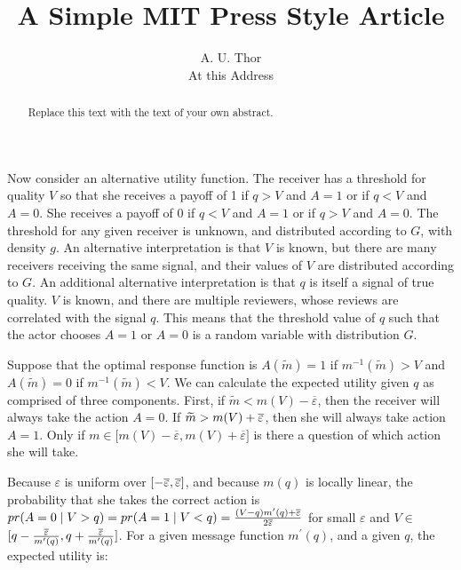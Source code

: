 \documentclass[12pt]{article}
\begin{document}
\title{A Simple MIT Press Style Article}
\author{A. U. Thor \\
At this Address}
\maketitle

\begin{abstract}
Replace this text with the text of your own abstract.
\end{abstract}

Now consider an alternative utility function. The receiver has a threshold
for quality $V$ so that she receives a payoff of 1 if $q>V$ and $A=1$ or if $%
q<V$ and $A=0$. She receives a payoff of 0 if $q<V$ and $A=1$ or if $q>V$
and $A=0$. The threshold for any given receiver is unknown, and distributed
according to $G$, with density $g$. An alternative interpretation is that $V$
is known, but there are many receivers receiving the same signal, and their
values of $V$ are distributed according to $G$. An additional alternative
interpretation is that $q$ is itself a signal of true quality. $V$ is known,
and there are multiple reviewers, whose reviews are correlated with the
signal $q$. This means that the threshold value of $q$ such that the actor
chooses $A=1$ or $A=0$ is a random variable with distribution $G$. 

Suppose that the optimal response function is $A(\widetilde{m})=1$ if $%
m^{-1}(\widetilde{m})>V$ and $A(\widetilde{m})=0$ if $m^{-1}(\widetilde{m}%
)<V $. We can calculate the expected utility given $q$ as comprised of three
components. First, if $\widetilde{m}<m(V)-\overline{\varepsilon }$, then the
receiver will always take the action $A=0$. If $\widetilde{m}>m(V)+\overline{%
\varepsilon }$, then she will always take action $A=1$. Only if $m\in
\lbrack m(V)-\overline{\varepsilon },m(V)+\overline{\varepsilon }]$ is there
a question of which action she will take.

Because $\varepsilon $ is uniform over $[-\overline{\varepsilon },\overline{%
\varepsilon }]$, and because $m(q)$ is locally linear, the probability that
she takes the correct action is $pr(A=0\mid V>q)=pr(A=1\mid V<q)=\frac{%
\left( V-q\right) m^{\prime }(q)+\overline{\varepsilon }}{2\overline{%
\varepsilon }}$ for small $\varepsilon $ and $V\in $ $[q-\frac{\overline{%
\varepsilon }}{m^{\prime }(q)},q+\frac{\overline{\varepsilon }}{m^{\prime
}(q)}]$. For a given message function $m^{\prime }(q)$, and a given $q$, the
expected utility is: \bigskip
\end{document}
